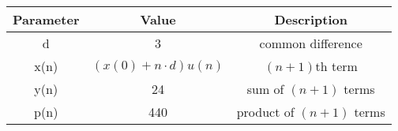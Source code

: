\begin{tabular}{|c|c|c|}
    \hline
    \textbf{Parameter} & \textbf{Value} & \textbf{Description} \\
    \hline
    d     & 3 & common difference\\
    \hline
    x(n)  & $\left(x(0) + n \cdot d\right) u(n)$ & $(n+1)$th term \\ 
    \hline
    y(n)  & 24 & sum of $(n+1)$ terms \\
    \hline
    p(n)  & 440 & product of $(n+1)$ terms \\
    \hline
\end{tabular}


